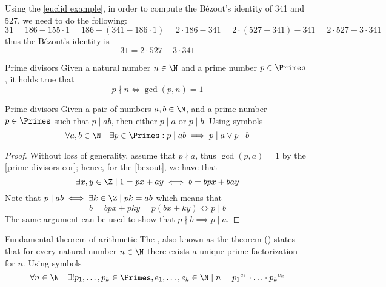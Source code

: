 \documentclass[a4paper, 12pt]{report}
\begin{document}
    \begin{example}
        Using the \cref{euclid example}, in order to compute the Bézout's identity of 341 and 527, we need to do the following: $$31 = 186 - 155 \cdot 1 = 186 - (341 - 186 \cdot 1) = 2 \cdot 186 - 341 = 2 \cdot (527 - 341) - 341 = 2 \cdot 527 - 3 \cdot 341$$ thus the Bézout's identity is $$31 = 2 \cdot 527 - 3\cdot 341$$
    \end{example}

    \begin{framedcor}[label={prime divisors cor}]{Prime divisors}
        Given a natural number $n \in \N$ and a prime number $p \in \Primes$ , it holds true that $$p \nmid n \iff \gcd(p, n) = 1$$
    \end{framedcor}


    \begin{framedlem}{Prime divisors}
        Given a pair of numbers $a, b \in \N$, and a prime number $p \in \Primes$ such that $p \mid ab$, then either $p \mid a$ or $p \mid b$. Using symbols $$\forall a, b \in \N \quad \exists p \in \Primes : p \mid ab \implies p \mid a \lor p \mid b$$
    \end{framedlem}

    \begin{proof}
        Without loss of generality, assume that $p \nmid a$, thus $\gcd(p, a) = 1$ by the \cref{prime divisors cor}; hence, for the \cref{bezout}, we have that $$\exists x, y \in \Z \mid 1 = px + ay \iff b = bpx + bay$$ Note that $p \mid ab \iff \exists k \in \Z \mid pk = ab$ which means that $$b = bpx + pky = p(bx+ky) \iff p \mid b$$ The same argument can be used to show that $p \nmid b \implies p \mid a$.
    \end{proof}

    \begin{framedthm}[label={upf}]{Fundamental theorem of arithmetic}
        The , also known as the  theorem () states that for every natural number $n \in \N$ there exists a unique prime factorization for $n$. Using symbols $$\forall n \in \N \quad \exists ! p_1, \ldots, p_k \in \Primes, e_1, \ldots, e_k \in \N \mid n = {p_1}^{e_1} \cdot \ldots \cdot {p_k}^{e_k}$$
    \end{framedthm}
\end{document}

